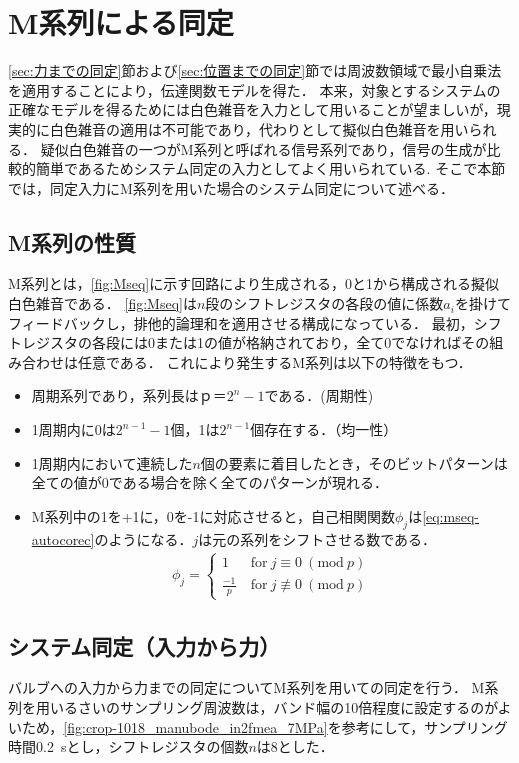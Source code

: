\section{M系列による同定}
\ref{sec:力までの同定}節および\ref{sec:位置までの同定}節では周波数領域で最小自乗法を適用することにより，伝達関数モデルを得た．
本来，対象とするシステムの正確なモデルを得るためには白色雑音を入力として用いることが望ましいが，現実的に白色雑音の適用は不可能であり，代わりとして擬似白色雑音を用いられる．
疑似白色雑音の一つがM系列と呼ばれる信号系列であり，信号の生成が比較的簡単であるためシステム同定の入力としてよく用いられている\cite{足立200909,柏木濶1998m}.
そこで本節では，同定入力にM系列を用いた場合のシステム同定について述べる．
\subsection{M系列の性質}
M系列とは，\figname\ref{fig:Mseq}に示す回路により生成される，0と1から構成される擬似白色雑音である．
\figname\ref{fig:Mseq}は$n$段のシフトレジスタの各段の値に係数$a_i$を掛けてフィードバックし，排他的論理和を適用させる構成になっている．
最初，シフトレジスタの各段には0または1の値が格納されており，全て0でなければその組み合わせは任意である．
これにより発生するM系列は以下の特徴をもつ\cite{吉谷清澄1971pn,近藤勝也2004m,柏木濶1981m}．
\begin{itemize}
    \item 周期系列であり，系列長は$ｐ＝2^n-1$である．(周期性)
    \item 1周期内に0は$2^{n-1}-1$個，1は$2^{n-1}$個存在する．（均一性）
    \item 1周期内において連続した$n$個の要素に着目したとき，そのビットパターンは全ての値が0である場合を除く全てのパターンが現れる．
    \item M系列中の1を+1に，0を-1に対応させると，自己相関関数$\phi_j$は\eqnname\eqref{eq:mseq-autocorec}のようになる．$j$は元の系列をシフトさせる数である．
    \begin{align}
        \label{eq:mseq-autocorec}
        \phi_j = 
        \begin{cases}
            \displaystyle
            1~&\mathrm{for}~j\equiv0~(\mathrm{mod}~p)\\
            \tfrac{-1}{p}~&\mathrm{for}~j\not\equiv0~(\mathrm{mod}~p)
        \end{cases}
    \end{align}
\end{itemize}
\subsection{システム同定（入力から力）}
\label{sec:Mseq_in2force}
バルブへの入力から力までの同定についてM系列を用いての同定を行う．
M系列を用いるさいのサンプリング周波数は，バンド幅の10倍程度に設定するのがよいため\cite{足立200909}，\figname\ref{fig:crop-1018_manubode_in2fmea_7MPa}を参考にして，サンプリング時間\SI{0.2}{s}とし，シフトレジスタの個数$n$は8とした．

